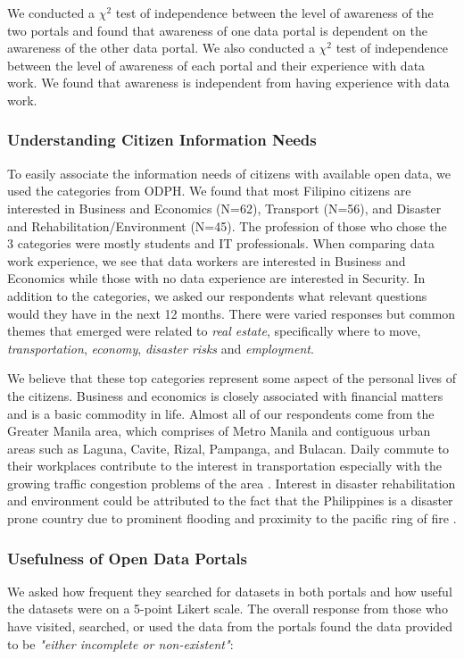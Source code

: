 \documentclass{sigchi}
\begin{document}
We conducted a $\chi^2$ test of independence between the level of awareness of the two portals and found that awareness of one data portal is dependent on the awareness of the other data portal. We also conducted a $\chi^2$ test of independence between the level of awareness of each portal and their experience with data work. We found that awareness is independent from having experience with data work. 

\subsubsection{Understanding Citizen Information Needs}
To easily associate the information needs of citizens with available open data, we used the categories from ODPH. We found that most Filipino citizens are interested in Business and Economics (N=62), Transport (N=56), and Disaster and Rehabilitation/Environment (N=45). The profession of those who chose the 3 categories were mostly students and IT professionals. When comparing data work experience, we see that data workers are interested in Business and Economics while those with no data experience are interested in Security. In addition to the categories, we asked our respondents what relevant questions would they have in the next 12 months. There were varied responses but common themes that emerged were related to \textit{real estate}, specifically where to move, \textit{transportation}, \textit{economy}, \textit{disaster risks} and \textit{employment}. 

We believe that these top categories represent some aspect of the personal lives of the citizens. Business and economics is closely associated with financial matters and is a basic commodity in life. Almost all of our respondents come from the Greater Manila area, which comprises of Metro Manila and contiguous urban areas such as Laguna, Cavite, Rizal, Pampanga, and Bulacan. Daily commute to their workplaces contribute to the interest in transportation especially with the growing traffic congestion problems of the area \cite{Traffic55:online, Expertsa90:online}. Interest in disaster rehabilitation and environment could be attributed to the fact that the Philippines is a disaster prone country due to prominent flooding and proximity to the pacific ring of fire \cite{WhyPhili58:online}.

\subsubsection{Usefulness of Open Data Portals}
We asked how frequent they searched for datasets in both portals and how useful the datasets were on a 5-point Likert scale. The overall response from those who have visited, searched, or used the data from the portals found the data provided to be \textit{"either incomplete or non-existent"}: 
\end{document}
